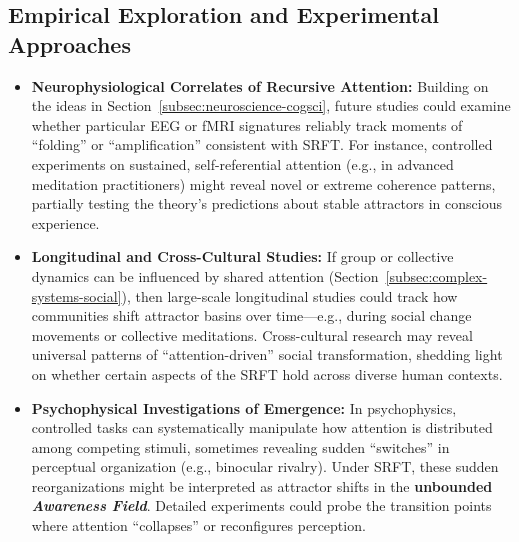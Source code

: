 \documentclass[12pt,a4paper]{article}
\begin{document}
\subsection{Empirical Exploration and Experimental Approaches}
\label{subsec:empirical-exploration}
\begin{itemize}
    \item \textbf{Neurophysiological Correlates of Recursive Attention:}
    Building on the ideas in Section~\ref{subsec:neuroscience-cogsci}, future studies could examine whether particular EEG or fMRI signatures reliably track moments of “folding” or “amplification” consistent with SRFT. For instance, controlled experiments on sustained, self-referential attention (e.g., in advanced meditation practitioners) might reveal novel or extreme coherence patterns, partially testing the theory’s predictions about stable attractors in conscious experience.

    \item \textbf{Longitudinal and Cross-Cultural Studies:}
    If group or collective dynamics can be influenced by shared attention (Section~\ref{subsec:complex-systems-social}), then large-scale longitudinal studies could track how communities shift attractor basins over time—e.g., during social change movements or collective meditations. Cross-cultural research may reveal universal patterns of “attention-driven” social transformation, shedding light on whether certain aspects of the SRFT hold across diverse human contexts.

    \item \textbf{Psychophysical Investigations of Emergence:}
    In psychophysics, controlled tasks can systematically manipulate how attention is distributed among competing stimuli, sometimes revealing sudden “switches” in perceptual organization (e.g., binocular rivalry). Under SRFT, these sudden reorganizations might be interpreted as attractor shifts in the \textbf{unbounded \emph{Awareness Field}}. Detailed experiments could probe the transition points where attention “collapses” or reconfigures perception.
\end{itemize}
\end{document}
